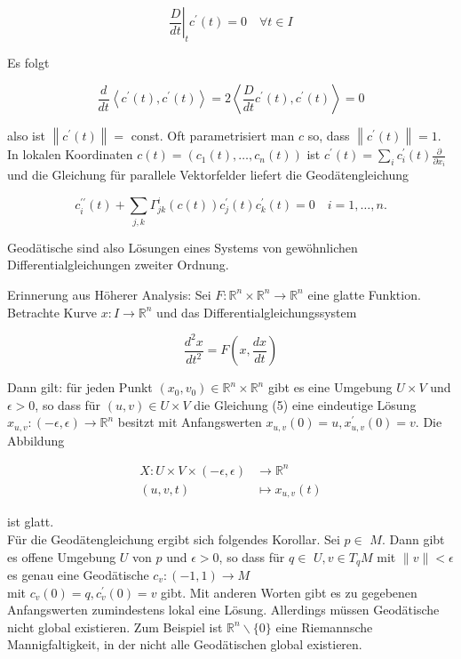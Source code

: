 \documentclass[10pt]{article}
\begin{document}
$$
\left.\frac{D}{d t}\right|_{t} c^{\prime}(t)=0 \quad \forall t \in I
$$

Es folgt

$$
\frac{d}{d t}\left\langle c^{\prime}(t), c^{\prime}(t)\right\rangle=2\left\langle\frac{D}{d t} c^{\prime}(t), c^{\prime}(t)\right\rangle=0
$$

also ist $\left\|c^{\prime}(t)\right\|=$ const. Oft parametrisiert man $c$ so, dass $\left\|c^{\prime}(t)\right\|=1$.\\
In lokalen Koordinaten $c(t)=\left(c_{1}(t), \ldots, c_{n}(t)\right)$ ist $c^{\prime}(t)=\sum_{i} c_{i}^{\prime}(t) \frac{\partial}{\partial x_{i}}$ und die Gleichung für parallele Vektorfelder liefert die Geodätengleichung

$$
c_{i}^{\prime \prime}(t)+\sum_{j, k} \Gamma_{j k}^{i}(c(t)) c_{j}^{\prime}(t) c_{k}^{\prime}(t)=0 \quad i=1, \ldots, n .
$$

Geodätische sind also Lösungen eines Systems von gewöhnlichen Differentialgleichungen zweiter Ordnung.

Erinnerung aus Höherer Analysis: Sei $F: \mathbb{R}^{n} \times \mathbb{R}^{n} \rightarrow \mathbb{R}^{n}$ eine glatte Funktion. Betrachte Kurve $x: I \rightarrow \mathbb{R}^{n}$ und das Differentialgleichungssystem


\begin{equation*}
\frac{d^{2} x}{d t^{2}}=F\left(x, \frac{d x}{d t}\right) \tag{5}
\end{equation*}


Dann gilt: für jeden Punkt $\left(x_{0}, v_{0}\right) \in \mathbb{R}^{n} \times \mathbb{R}^{n}$ gibt es eine Umgebung $U \times V$ und $\epsilon>0$, so dass für $(u, v) \in U \times V$ die Gleichung (5) eine eindeutige Lösung $x_{u, v}:(-\epsilon, \epsilon) \rightarrow \mathbb{R}^{n}$ besitzt mit Anfangswerten $x_{u, v}(0)=u, x_{u, v}^{\prime}(0)=v$. Die Abbildung

$$
\begin{aligned}
X: U \times V \times(-\epsilon, \epsilon) & \rightarrow \mathbb{R}^{n} \\
(u, v, t) & \mapsto x_{u, v}(t)
\end{aligned}
$$

ist glatt.\\
Für die Geodätengleichung ergibt sich folgendes Korollar. Sei $p \in$ $M$. Dann gibt es offene Umgebung $U$ von $p$ und $\epsilon>0$, so dass für $q \in$ $U, v \in T_{q} M$ mit $\|v\|<\epsilon$ es genau eine Geodätische $c_{v}:(-1,1) \rightarrow M$\\
mit $c_{v}(0)=q, c_{v}^{\prime}(0)=v$ gibt. Mit anderen Worten gibt es zu gegebenen Anfangswerten zumindestens lokal eine Lösung. Allerdings müssen Geodätische nicht global existieren. Zum Beispiel ist $\mathbb{R}^{n} \backslash\{0\}$ eine Riemannsche Mannigfaltigkeit, in der nicht alle Geodätischen global existieren.
\end{document}
